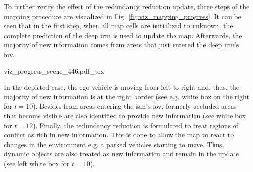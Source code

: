 \begin{center}
\end{center}
To further verify the effect of the redundancy reduction update, three steps of the mapping procedure are visualized in Fig. \ref{fig:viz_mapping_progress}. It can be seen that in the first step, when all map cells are initialized to unknown, the complete prediction of the deep \gls{irm} is used to update the map. Afterwards, the majority of new information comes from areas that just entered the deep \gls{irm}'s \gls{fov}. 
\begin{center}
	{viz_progress_scene_446.pdf_tex}
\end{center}
In the depicted case, the ego vehicle is moving from left to right and, thus, the majority of new information is at the right border (see e.g. white box on the right for $t=10$). 
Besides from areas entering the \gls{ism}'s \gls{fov}, formerly occluded areas that become visible are also identified to provide new information (see white box for $t=12$). Finally, the redundancy reduction is formulated to treat regions of conflict as rich in new information. This is done to allow the map to react to changes in the environment e.g. a parked vehicles starting to move. Thus, dynamic objects are also treated as new information and remain in the update (see left white box for $t=10$).
%
